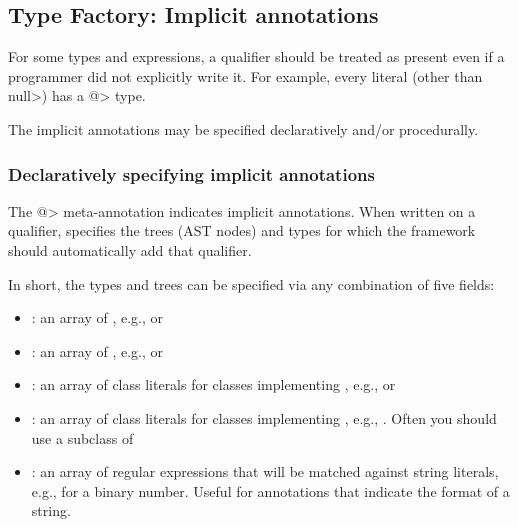 \subsection{Type Factory: Implicit annotations\label{writing-type-introduction}}

For some types and expressions, a qualifier should be treated as present
even if a programmer did not explicitly write it.  For example, every
literal (other than \<null>) has a \<@> type.

The implicit annotations may be specified declaratively and/or procedurally.


\subsubsection{Declaratively specifying implicit annotations}

The \<@> meta-annotation indicates implicit annotations.
When written on a qualifier, 
specifies the trees (AST nodes) and types for which the framework should
automatically add that qualifier.

In short, the types and trees can be
specified via any combination of five fields:

  \begin{itemize}
  \item {}: an array of
    , e.g.,
     or 
  \item {}: an array of
    , e.g., 
    or 
  \item {}: an array of class literals for classes
    implementing , e.g.,
     or 
  \item {}: an array of class literals for classes
    implementing , e.g.,
    .  Often you should use
    a subclass of 
  \item {}: an array of regular expressions that will
    be matched against
    string literals, e.g.,  for a binary number.  Useful
    for annotations that indicate the format of a string.
  \end{itemize}

